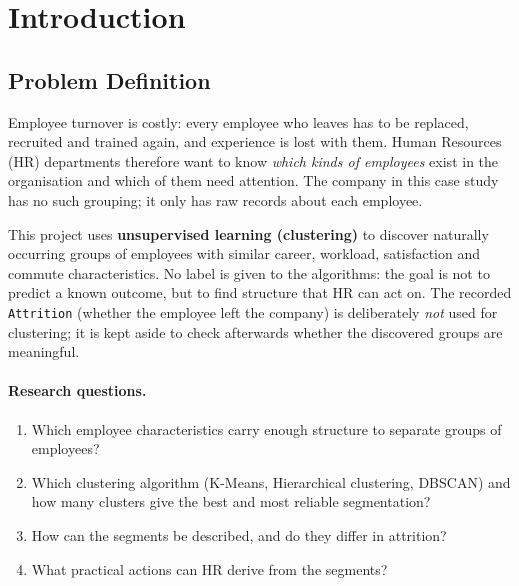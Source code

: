 \documentclass[12pt,a4paper]{article}
\begin{document}

\tableofcontents

\clearpage



\section{Introduction}
\label{sec:intro}

\subsection{Problem Definition}

Employee turnover is costly: every employee who leaves has to be replaced,
recruited and trained again, and experience is lost with them. Human
Resources (HR) departments therefore want to know \emph{which kinds of
employees} exist in the organisation and which of them need attention. The
company in this case study has no such grouping; it only has raw records
about each employee.

This project uses \textbf{unsupervised learning (clustering)} to discover
naturally occurring groups of employees with similar career, workload,
satisfaction and commute characteristics. No label is given to the
algorithms: the goal is not to predict a known outcome, but to find structure
that HR can act on. The recorded \texttt{Attrition} (whether the employee left
the company) is deliberately \emph{not} used for clustering; it is kept aside
to check afterwards whether the discovered groups are meaningful.

\paragraph{Research questions.}
\begin{enumerate}
  \item Which employee characteristics carry enough structure to separate
  groups of employees?
  \item Which clustering algorithm (K-Means, Hierarchical clustering, DBSCAN)
  and how many clusters give the best and most reliable segmentation?
  \item How can the segments be described, and do they differ in attrition?
  \item What practical actions can HR derive from the segments?
\end{enumerate}
\end{document}
